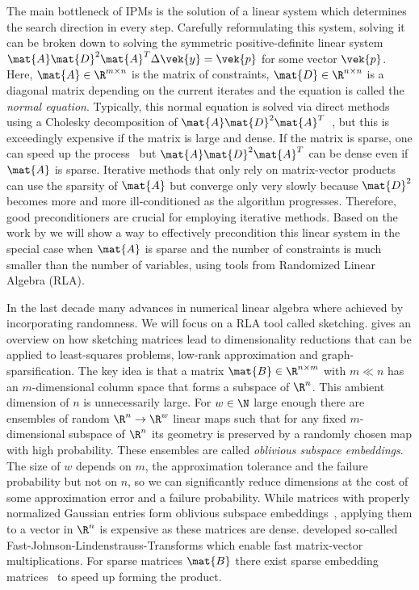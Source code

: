The main bottleneck of IPMs is the solution of a linear system which determines the search direction in every step.
Carefully reformulating this system, solving it can be broken down to solving the symmetric positive-definite linear system \(\mat{A} \mat{D}^2 \mat{A}^T \Delta \vek{y} = \vek{p}\) for some vector \(\vek{p}\).
Here, \(\mat{A} \in \R^{m \times n}\) is the matrix of constraints, \(\mat{D} \in \R^{n \times n}\) is a diagonal matrix depending on the current iterates and the equation is called the \emph{normal equation}.
Typically, this normal equation is solved via direct methods using a Cholesky decomposition of \(\mat{A} \mat{D}^2 \mat{A}^T\)~\cite[p. 17]{Wright-PrimalDualInteriorPointMethods}, but this is exceedingly expensive if the matrix is large and dense.
If the matrix is sparse, one can speed up the process~\cite{NgPeyton-SparseCholesky} but \(\mat{A} \mat{D}^2 \mat{A}^T\) can be dense even if \(\mat{A}\) is sparse.
Iterative methods that only rely on matrix-vector products can use the sparsity of \(\mat{A}\) but converge only very slowly because \(\mat{D}^2\) becomes more and more ill-conditioned as the algorithm progresses.
Therefore, good preconditioners are crucial for employing iterative methods.
Based on the work by \textcite{Avron-FasterRandomizedInfeasibleIPMs} we will show a way to effectively precondition this linear system in the special case when \(\mat{A}\) is sparse and the number of constraints is much smaller than the number of variables, using tools from Randomized Linear Algebra (RLA).

In the last decade many advances in numerical linear algebra where achieved by incorporating randomness.
We will focus on a RLA tool called sketching.
\textcite{Woodruff-Sketching} gives an overview on how sketching matrices lead to dimensionality reductions that can be applied to least-squares problems, low-rank approximation and graph-sparsification.
The key idea is that a matrix \(\mat{B} \in \R^{n \times m}\) with \(m \ll n\) has an \(m\)-dimensional column space that forms a subspace of \(\R^n\).
This ambient dimension of \(n\) is unnecessarily large.
For \(w \in \N\) large enough there are ensembles of random \(\R^n \to \R^w\) linear maps such that for any fixed \(m\)-dimensional subspace of \(\R^n\) its geometry is preserved by a randomly chosen map with high probability.
These ensembles are called \emph{oblivious subspace embeddings}.
The size of \(w\) depends on \(m\), the approximation tolerance and the failure probability but not on \(n\), so we can significantly reduce dimensions at the cost of some approximation error and a failure probability.
While matrices with properly normalized Gaussian entries form oblivious subspace embeddings~\cite[Theorem 6]{Woodruff-Sketching}, applying them to a vector in \(\R^n\) is expensive as these matrices are dense.
\textcite{AilonChazelle-FastJohnsonLindenstraussTransform} developed so-called Fast-Johnson-Lindenstrauss-Transforms which enable fast matrix-vector multiplications. For sparse matrices \(\mat{B}\) there exist sparse embedding matrices~\cite{Achlioptas-SparseSketching,Cohen-NearlyTightObliviousSubspaceEmbeddings} to speed up forming the product.

